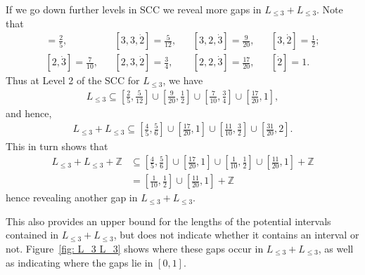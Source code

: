 \documentclass{ws-ijnt}
\begin{document}
	If we go down further levels in SCC we reveal more gaps in $L_{\leq 3}+L_{\leq 3}$. Note that
	\begin{align*}
		[\dot{3}]     =\frac{ 2}{ 5}, &&
		[3,3,\dot{2}] =\frac{ 5}{12}, &&
		[3,2,\dot{3}] =\frac{ 9}{20}, &&
		[3,\dot{2}]   =\frac{ 1}{ 2}; \\
		[2,\dot{3}]   =\frac{ 7}{10}, &&
		[2,3,\dot{2}] =\frac{ 3}{ 4}, &&
		[2,2,\dot{3}] =\frac{17}{20}, &&
		[\dot{2}]     =1. 
	\end{align*}
	Thus at Level 2 of the SCC for $L_{\leq 3}$, we have
	\begin{align*}
		L_{\leq 3}
		\subseteq
		\left[\frac{2}{5},\frac{5}{12}\right]\cup
		\left[\frac{9}{20},\frac{1}{2}\right]\cup
		\left[\frac{7}{10},\frac{3}{4}\right]\cup
		\left[\frac{17}{20},1\right],
	\end{align*}
	and hence,
	\begin{align*}
		L_{\leq 3}+L_{\leq 3}
		\subseteq
		\left[\frac{4}{5},\frac{5}{6}\right]\cup
		\left[\frac{17}{20},1\right]\cup
		\left[\frac{11}{10},\frac{3}{2}\right]\cup
		\left[\frac{31}{20},2\right].
	\end{align*}
	This in turn shows that
	\begin{align*}
		L_{\leq 3}+L_{\leq 3}+\mathbb{Z}
		&\subseteq
		\left[\frac{4}{5},\frac{5}{6}\right]\cup
		\left[\frac{17}{20},1\right]\cup
		\left[\frac{1}{10},\frac{1}{2}\right]\cup
		\left[\frac{11}{20},1\right]+\mathbb{Z} \\
		&=\left[\frac{1}{10},\frac{1}{2}\right]\cup
		\left[\frac{11}{20},1\right]+\mathbb{Z}
	\end{align*}
	hence revealing another gap in $L_{\leq 3}+L_{\leq 3}$.
	
	This also provides an upper bound for the lengths of the potential intervals contained in $L_{\leq3}+L_{\leq 3}$, but does not indicate whether it contains an interval or not. Figure~\ref{fig: L_3 L_3} shows where these gaps occur in $L_{\leq 3}+L_{\leq 3}$, as well as indicating where the gaps lie in $[0,1]$.
	
\end{document}
